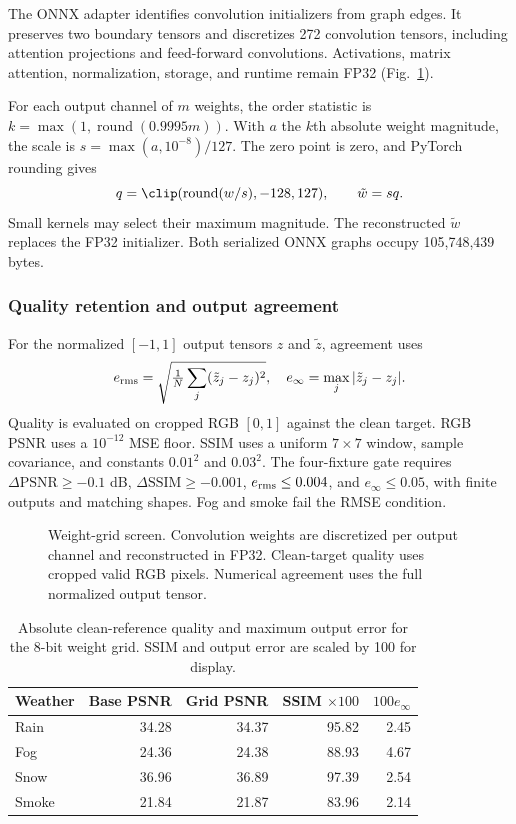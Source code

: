 The ONNX adapter identifies convolution initializers from graph edges. It preserves two boundary tensors and discretizes 272 convolution tensors, including attention projections and feed-forward convolutions. Activations, matrix attention, normalization, storage, and runtime remain FP32 (Fig.~\ref{fig:weight-grid}).

For each output channel of $m$ weights, the order statistic is $k=\max(1,\operatorname{round}(0.9995m))$. With $a$ the $k$th absolute weight magnitude, the scale is $s=\max(a,10^{-8})/127$. The zero point is zero, and PyTorch rounding gives
\begin{equation}
q=\clip(\operatorname{round}(w/s),-128,127),\qquad \tilde w=sq.
\end{equation}
Small kernels may select their maximum magnitude. The reconstructed $\tilde w$ replaces the FP32 initializer. Both serialized ONNX graphs occupy 105,748,439 bytes.

\subsubsection{Quality retention and output agreement}
For the normalized $[-1,1]$ output tensors $z$ and $\tilde z$, agreement uses
\begin{equation}
e_{\rm rms}=\sqrt{\tfrac1N\sum_j(\tilde z_j-z_j)^2},
\quad e_{\infty}=\max_j|\tilde z_j-z_j|.
\end{equation}
Quality is evaluated on cropped RGB $[0,1]$ against the clean target. RGB PSNR uses a $10^{-12}$ MSE floor. SSIM uses a uniform $7\times7$ window, sample covariance, and constants $0.01^2$ and $0.03^2$. The four-fixture gate requires $\Delta\mathrm{PSNR}\geq-0.1$ dB, $\Delta\mathrm{SSIM}\geq-0.001$, $e_{\rm rms}\leq0.004$, and $e_\infty\leq0.05$, with finite outputs and matching shapes. Fog and smoke fail the RMSE condition.

\FloatBarrier
\begin{figure}[!t]
\centering\resizebox{\textwidth}{!}{}
\caption{Weight-grid screen. Convolution weights are discretized per output channel and reconstructed in FP32. Clean-target quality uses cropped valid RGB pixels. Numerical agreement uses the full normalized output tensor.}
\label{fig:weight-grid}
\end{figure}

\begin{table}[!t]
\centering\small
\caption{Absolute clean-reference quality and maximum output error for the 8-bit weight grid. SSIM and output error are scaled by 100 for display.}
\begin{tabular}{@{}lrrrr@{}}\toprule
Weather & Base PSNR & Grid PSNR & SSIM $\times100$ & $100e_\infty$\\\midrule
Rain &34.28&34.37&95.82&2.45\\
Fog &24.36&24.38&88.93&4.67\\
Snow &36.96&36.89&97.39&2.54\\
Smoke &21.84&21.87&83.96&2.14\\\bottomrule
\end{tabular}
\end{table}

